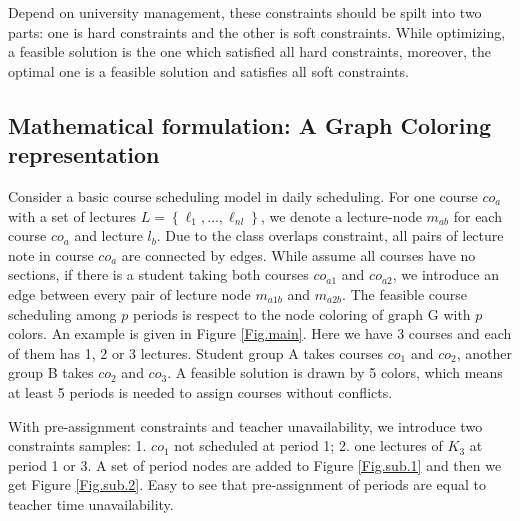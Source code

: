 \documentclass{article}
\begin{document}
Depend on university management, these constraints should be spilt into two parts: one is hard constraints and the other is soft constraints. While optimizing, a feasible solution is the one which satisfied all hard constraints, moreover, the optimal one is a feasible solution and satisfies all soft constraints.


\subsection{Mathematical formulation: A Graph Coloring representation}

Consider a basic course scheduling model in daily scheduling. For one course $co_a$ with a set of lectures $L=\left\{\ell_{1}, \ldots, \ell_{nl}\right\}$, we denote a lecture-node $m_{ab}$ for each course $co_a$ and lecture $l_b$. Due to the class overlaps constraint, all pairs of lecture note in course $co_a$ are connected by edges. While assume all courses have no sections, if there is a student taking both courses $co_{a1}$ and $co_{a2}$, we introduce an edge between every pair of lecture node $m_{a1b}$ and $m_{a2b}$. The feasible course scheduling among $p$ periods is respect to the node coloring of graph G with $p$ colors. An example is given in Figure \ref{Fig.main}. Here we have 3 courses and each of them has 1, 2 or 3 lectures. Student group A takes courses $co_1$ and $co_2$, another group B takes $co_2$ and $co_3$. A feasible solution is drawn by 5 colors, which means at least 5 periods is needed to assign courses without conflicts.

With pre-assignment constraints and teacher unavailability, we introduce two constraints samples: 1. $co_{1}$ not scheduled at period 1; 2. one lectures of $K_{3}$ at period 1 or 3. A set of period nodes are added to Figure \ref{Fig.sub.1} and then we get Figure \ref{Fig.sub.2}. Easy to see that pre-assignment of periods are equal to teacher time unavailability.
\end{document}
